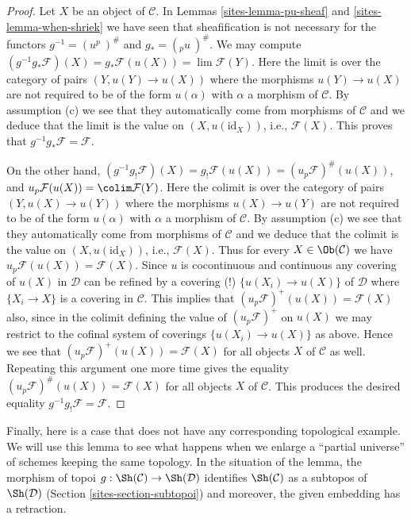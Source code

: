 \begin{proof}

Let $X$ be an object of $\mathcal{C}$.
In Lemmas \ref{sites-lemma-pu-sheaf} and \ref{sites-lemma-when-shriek} we have seen that
sheafification is not necessary for the functors
$g^{-1} = (u^p\ )^\#$ and $g_{*} = ({}_pu\ )^\#$.
We may compute
$(g^{-1}g_{*}\mathcal{F})(X) = g_{*}\mathcal{F}(u(X))
= \lim \mathcal{F}(Y)$. Here the limit
is over the category of pairs $(Y, u(Y) \to u(X))$
where the morphisms $u(Y) \to u(X)$ are not required to be
of the form $u(\alpha)$ with $\alpha$ a morphism of $\mathcal{C}$.
By assumption (c) we see that they automatically come from
morphisms of $\mathcal{C}$ and we deduce that the limit is the
value on $(X, u(\text{id}_X))$, i.e., $\mathcal{F}(X)$.
This proves that $g^{-1}g_{*}\mathcal{F} = \mathcal{F}$.

\medskip\noindent
On the other hand, $(g^{-1}g_{!}\mathcal{F})(X) =
g_{!}\mathcal{F}(u(X)) = (u_p\mathcal{F})^\#(u(X))$, and
$u_p\mathcal{F}(u(X)) = \colim \mathcal{F}(Y)$.
Here the colimit is over the category of pairs $(Y, u(X) \to u(Y))$
where the morphisms $u(X) \to u(Y)$ are not required to be
of the form $u(\alpha)$ with $\alpha$ a morphism of $\mathcal{C}$.
By assumption (c) we see that they automatically come
from morphisms of $\mathcal{C}$ and we deduce that the colimit is the
value on $(X, u(\text{id}_X))$, i.e., $\mathcal{F}(X)$. Thus for every
$X \in \Ob(\mathcal{C})$ we have
$u_p\mathcal{F}(u(X)) = \mathcal{F}(X)$.
Since $u$ is cocontinuous and continuous any covering of $u(X)$ in
$\mathcal{D}$ can be refined by a covering (!) $\{u(X_i) \to u(X)\}$
of $\mathcal{D}$ where $\{X_i \to X\}$ is a covering in $\mathcal{C}$.
This implies that $(u_p\mathcal{F})^+(u(X)) = \mathcal{F}(X)$ also,
since in the colimit defining the value of $(u_p\mathcal{F})^+$
on $u(X)$ we may restrict to the cofinal system of coverings
$\{u(X_i) \to u(X)\}$ as above. Hence we see that
$(u_p\mathcal{F})^+(u(X)) = \mathcal{F}(X)$ for all objects $X$
of $\mathcal{C}$ as well. Repeating this argument one more time
gives the equality $(u_p\mathcal{F})^\#(u(X)) = \mathcal{F}(X)$
for all objects $X$ of $\mathcal{C}$. This produces the desired
equality $g^{-1}g_!\mathcal{F} = \mathcal{F}$.
\end{proof}

Finally, here is a case that does not have any corresponding topological
example. We will use this lemma to see what happens when we enlarge a
``partial universe'' of schemes keeping the same topology. In the situation
of the lemma, the morphism of topoi $g : \Sh(\mathcal{C}) \to \Sh(\mathcal{D})$
identifies $\Sh(\mathcal{C})$ as a subtopos of $\Sh(\mathcal{D})$
(Section \ref{sites-section-subtopoi}) and moreover, the given embedding has a
retraction.

